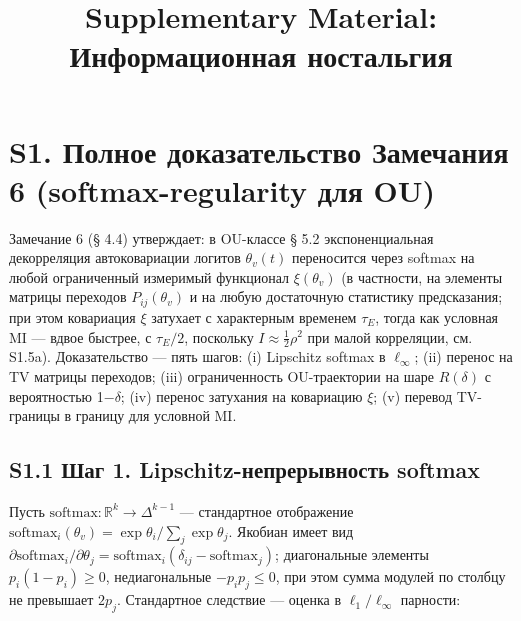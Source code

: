 \documentclass[pdflatex,sn-mathphys-ay]{sn-jnl}
\begin{document}
\title[Дополнительные материалы]{Supplementary Material: Информационная ностальгия}

\author*[1]{ }


\maketitle

\section*{S1. Полное доказательство Замечания 6 (softmax-regularity для OU)}\label{s1.-ux43fux43eux43bux43dux43eux435-ux434ux43eux43aux430ux437ux430ux442ux435ux43bux44cux441ux442ux432ux43e-ux437ux430ux43cux435ux447ux430ux43dux438ux44f-6-softmax-regularity-ux434ux43bux44f-ou}



Замечание 6 (§ 4.4) утверждает: в OU-классе § 5.2 экспоненциальная декорреляция автоковариации логитов \(\theta_v(t)\) переносится через softmax на любой ограниченный измеримый функционал \(\xi(\theta_v)\) (в частности, на элементы матрицы переходов \(P_{ij}(\theta_v)\) и на любую достаточную статистику предсказания; при этом ковариация \(\xi\) затухает с характерным временем \(\tau_E\), тогда как условная MI --- вдвое быстрее, с \(\tau_E/2\), поскольку \(I \approx \tfrac{1}{2}\rho^2\) при малой корреляции, см. S1.5a). Доказательство --- пять шагов: (i) Lipschitz softmax в \(\ell_\infty\); (ii) перенос на TV матрицы переходов; (iii) ограниченность OU-траектории на шаре \(R(\delta)\) с вероятностью 1\(-\delta\); (iv) перенос затухания на ковариацию \(\xi\); (v) перевод TV-границы в границу для условной MI.



\subsection*{S1.1 Шаг 1. Lipschitz-непрерывность softmax}\label{s1.1-ux448ux430ux433-1.-lipschitz-ux43dux435ux43fux440ux435ux440ux44bux432ux43dux43eux441ux442ux44c-softmax}



Пусть \(\text{softmax}: \mathbb{R}^k \to \Delta^{k-1}\) --- стандартное отображение \(\text{softmax}_i(\theta_v) = \exp\theta_i / \sum_j \exp\theta_j\). Якобиан имеет вид \(\partial \text{softmax}_i / \partial \theta_j = \text{softmax}_i(\delta_{ij} - \text{softmax}_j)\); диагональные элементы \(p_i(1-p_i) \ge 0\), недиагональные \(-p_i p_j \le 0\), при этом сумма модулей по столбцу не превышает \(2 p_j\). Стандартное следствие --- оценка в \(\ell_1 / \ell_\infty\) парности:
\end{document}
